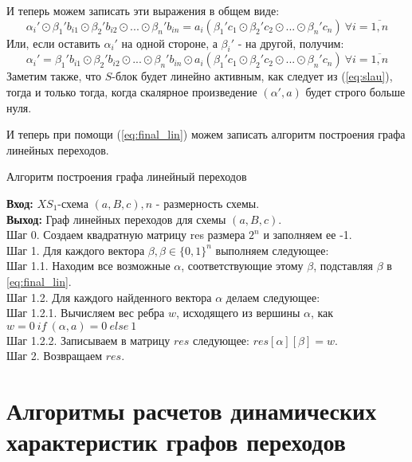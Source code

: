 \documentclass[a4paper,12pt]{extarticle}
\theoremstyle{plain} %
\begin{document}
\begin{large}
И теперь можем записать эти выражения в общем виде:
\begin{equation}\label{eq:slau}\alpha_i' \odot \beta_1'b_{i1} \odot \beta_2'b_{i2} \odot ... \odot \beta_n'b_{in} = a_i(\beta_1'c_1 \odot \beta_2'c_2 \odot ... \odot \beta_n'c_n) ~ \forall i=\overline{1,n} \end{equation}
Или, если оставить $\alpha_i'$ на одной стороне, а $\beta_i'$ - на другой, получим:
\begin{equation}\label{eq:final_lin}\alpha_i' = \beta_1'b_{i1} \odot \beta_2'b_{i2} \odot ... \odot \beta_n'b_{in} \odot a_i(\beta_1'c_1 \odot \beta_2'c_2 \odot ... \odot \beta_n'c_n) ~ \forall i=\overline{1,n} \end{equation}
Заметим также, что $S$-блок будет линейно активным, как следует из (\ref{eq:slau}), тогда и только тогда, когда скалярное произведение $(\alpha', a)$ будет строго больше нуля.

И теперь при помощи (\ref{eq:final_lin}) можем записать алгоритм построения графа линейных переходов.

\begin{algorithm}[H]
\caption{Алгоритм построения графа линейный переходов}
\label{diff_graph_construct}
\textbf{Вход:} $XS_1$-схема $(a, B, c), n$ - размерность схемы.\\
\textbf{Выход:} Граф линейных переходов для схемы $(a, B, c)$.\\
Шаг 0. Создаем квадратную матрицу res размера $2^n$ и заполняем ее -1. \\
Шаг 1. Для каждого вектора $\beta, \beta \in \{0, 1\}^n$ выполняем следующее: \\
Шаг 1.1. Находим все возможные $\alpha$, соответствующие этому $\beta$, подставляя $\beta$ в \ref{eq:final_lin}.\\
Шаг 1.2. Для каждого найденного вектора $\alpha$ делаем следующее:\\
Шаг 1.2.1. Вычисляем вес ребра $w$, исходящего из вершины $\alpha$, как $w = 0~ if~ (\alpha, a) = 0~ else~1$ \\
Шаг 1.2.2. Записываем в матрицу $res$ следующее: $res[\alpha][\beta] = w$.\\
Шаг 2. Возвращаем $res$.\\
\end{algorithm} 

\newpage
\section{Алгоритмы расчетов динамических характеристик графов переходов}


\end{large}
\end{document}
